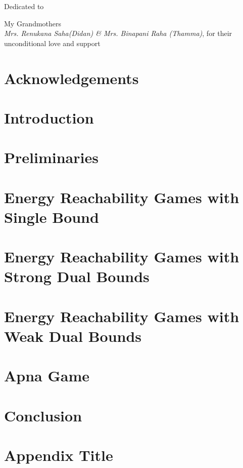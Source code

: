 \documentclass[a4paper,12pt, twoside]{book}
\theoremstyle{definition}
\begin{document}
\begin{center}
{\Large Dedicated to\par}
\vskip 0.3cm
My Grandmothers\\
\vskip 0.2cm
\textit{Mrs. Renukana Saha(Didan)    \&    Mrs. Binapani Raha
(Thamma)}, 
\vskip 0.2cm
for their unconditional love and support
\end{center}
\chapter*{Acknowledgements}


\tableofcontents

\chapter{Introduction}

 
\chapter{Preliminaries}

 
\chapter{Energy Reachability Games with Single Bound}

 
\chapter{Energy Reachability Games with Strong Dual Bounds}


\chapter{Energy Reachability Games with Weak Dual Bounds}

 
\chapter{Apna Game}


\chapter{Conclusion}





\appendix
\chapter{Appendix Title}

\end{document}
